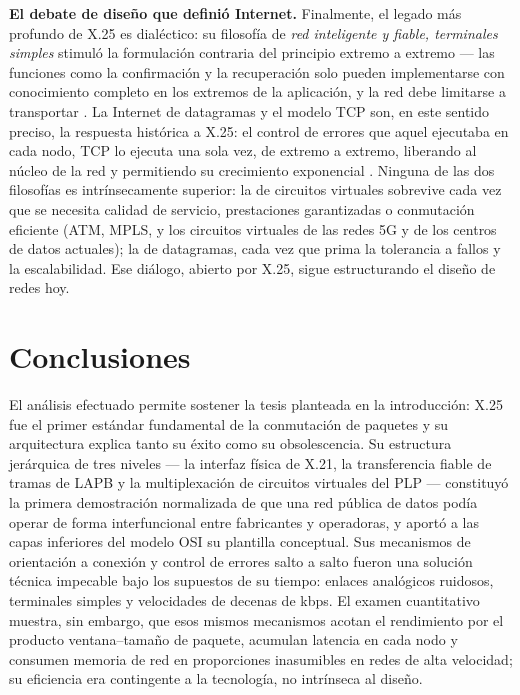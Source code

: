 \documentclass[12pt,a4paper]{article}
\begin{document}
\textbf{El debate de diseño que definió Internet.} Finalmente, el legado más profundo de X.25 es dialéctico: su filosofía de \emph{red inteligente y fiable, terminales simples} stimuló la formulación contraria del principio extremo a extremo --- las funciones como la confirmación y la recuperación solo pueden implementarse con conocimiento completo en los extremos de la aplicación, y la red debe limitarse a transportar \cite{saltzer1984}. La Internet de datagramas y el modelo TCP son, en este sentido preciso, la respuesta histórica a X.25: el control de errores que aquel ejecutaba en cada nodo, TCP lo ejecuta una sola vez, de extremo a extremo, liberando al núcleo de la red y permitiendo su crecimiento exponencial \cite{kurose2017}. Ninguna de las dos filosofías es intrínsecamente superior: la de circuitos virtuales sobrevive cada vez que se necesita calidad de servicio, prestaciones garantizadas o conmutación eficiente (ATM, MPLS, y los circuitos virtuales de las redes 5G y de los centros de datos actuales); la de datagramas, cada vez que prima la tolerancia a fallos y la escalabilidad. Ese diálogo, abierto por X.25, sigue estructurando el diseño de redes hoy.

\section{Conclusiones}

El análisis efectuado permite sostener la tesis planteada en la introducción: X.25 fue el primer estándar fundamental de la conmutación de paquetes y su arquitectura explica tanto su éxito como su obsolescencia. Su estructura jerárquica de tres niveles --- la interfaz física de X.21, la transferencia fiable de tramas de LAPB y la multiplexación de circuitos virtuales del PLP --- constituyó la primera demostración normalizada de que una red pública de datos podía operar de forma interfuncional entre fabricantes y operadoras, y aportó a las capas inferiores del modelo OSI su plantilla conceptual. Sus mecanismos de orientación a conexión y control de errores salto a salto fueron una solución técnica impecable bajo los supuestos de su tiempo: enlaces analógicos ruidosos, terminales simples y velocidades de decenas de kbps. El examen cuantitativo muestra, sin embargo, que esos mismos mecanismos acotan el rendimiento por el producto ventana--tamaño de paquete, acumulan latencia en cada nodo y consumen memoria de red en proporciones inasumibles en redes de alta velocidad; su eficiencia era contingente a la tecnología, no intrínseca al diseño.
\end{document}
